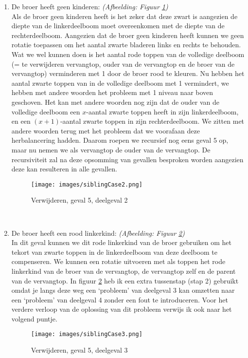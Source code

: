 \documentclass[11pt,a4paper]{report}
\begin{document}
\begin{description}
\begin{enumerate}
\item De broer heeft geen kinderen: \textsl{(Afbeelding: Figuur \ref{siblingCase2})}\\
Als de broer geen kinderen heeft is het zeker dat deze zwart is aangezien de diepte van de linkerdeelboom moet overeenkomen met de diepte van de rechterdeelboom. Aangezien dat de broer geen kinderen heeft kunnen we geen rotatie toepassen om het aantal zwarte bladeren links en rechts te behouden. Wat we wel kunnen doen is het aantal rode toppen van de volledige deelboom (= te verwijderen vervangtop, ouder van de vervangtop en de broer van de vervangtop) verminderen met 1 door de broer rood te kleuren. Nu hebben het aantal zwarte toppen van in de volledige deelboom met 1 vermindert, we hebben met andere woorden het probleem met 1 niveau naar boven geschoven. Het kan met andere woorden nog zijn dat de ouder van de volledige deelboom een $x$-aantal zwarte toppen heeft in zijn linkerdeelboom, en een $(x+1)$-aantal zwarte toppen in zijn rechterdeelboom. We zitten met andere woorden terug met het probleem dat we voorafaan deze herbalancering hadden. Daarom roepen we recursief nog eens geval 5 op, maar nu nemen we als vervangtop de ouder van de vervangtop. De recursiviteit zal na deze opsomming van gevallen besproken worden aangezien deze kan resulteren in alle gevallen.\\
\begin{figure}[h!]
	\centering
		\texttt{[image: images/siblingCase2.png]}
	\caption{Verwijderen, geval 5, deelgeval 2}
	\label{siblingCase2}
\end{figure}\\

\item De broer heeft een rood linkerkind: \textsl{(Afbeelding: Figuur \ref{siblingCase3})}\\
In dit geval kunnen we dit rode linkerkind van de broer gebruiken om het tekort van zwarte toppen in de linkerdeelboom van deze deelboom te compenseren. We kunnen een rotatie uitvoeren met als toppen het rode linkerkind van de broer van de vervangtop, de vervangtop zelf en de parent van de vervangtop. In figuur \ref{siblingCase3} heb ik een extra tussenstap (stap 2) gebruikt omdat je langs deze weg een `probleem' van deelgeval 3 kan omzetten naar een `probleem' van deelgeval 4 zonder een fout te introduceren. Voor het verdere verloop van de oplossing van dit probleem verwijs ik ook naar het volgend puntje.
\begin{figure}[h!]
	\centering
		\texttt{[image: images/siblingCase3.png]}
	\caption{Verwijderen, geval 5, deelgeval 3}
	\label{siblingCase3}
\end{figure}\\


\end{enumerate}
\end{description}
\end{document}
